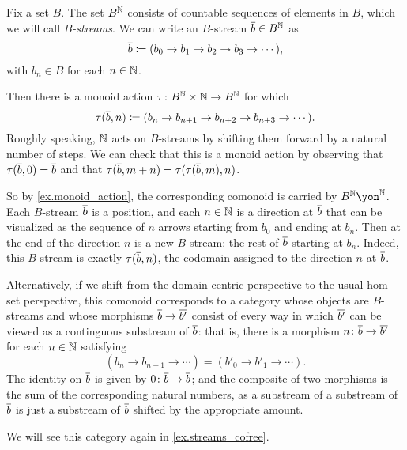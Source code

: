 \documentclass[Book-Poly]{subfiles}
\begin{document}
\begin{example}\label{ex.streams_category}
Fix a set $B$.
The set $B^{\mathbb{N}}$ consists of countable sequences of elements in $B$, which we will call \emph{$B$-streams}.
We can write an $B$-stream $\overline{b}\in B^{\mathbb{N}}$ as
\[
    \overline{b}\coloneqq(b_0\to b_1\to b_2\to b_3\to\cdots),
\]
with $b_n\in B$ for each $n\in\mathbb{N}$.

Then there is a monoid action $\tau\colon B^{\mathbb{N}}\times\mathbb{N}\to B^{\mathbb{N}}$ for which
\[
    \tau(\overline{b},n)\coloneqq(b_n\to b_{n+1}\to b_{n+2}\to b_{n+3}\to\cdots).
\]
Roughly speaking, $\mathbb{N}$ acts on $B$-streams by shifting them forward by a natural number of steps.
We can check that this is a monoid action by observing that $\tau(\overline{b},0)=\overline{b}$ and that $\tau(\overline{b},m+n)=\tau(\tau(\overline{b},m),n)$.

So by \cref{ex.monoid_action}, the corresponding comonoid is carried by $B^\nn\yon^\nn$.
Each $B$-stream $\overline{b}$ is a position, and each $n\in\mathbb{N}$ is a direction at $\overline{b}$ that can be visualized as the sequence of $n$ arrows starting from $b_0$ and ending at $b_n$.
Then at the end of the direction $n$ is a new $B$-stream: the rest of $\overline{b}$ starting at $b_n$.
Indeed, this $B$-stream is exactly $\tau(\overline{b},n)$, the codomain assigned to the direction $n$ at $\overline{b}$.

Alternatively, if we shift from the domain-centric perspective to the usual hom-set perspective, this comonoid corresponds to a category whose objects are $B$-streams and whose morphisms $\overline{b}\to\overline{b'}$ consist of every way in which $\overline{b'}$ can be viewed as a continguous substream of $\overline{b}$: that is, there is a morphism $n\colon\overline{b}\to\overline{b'}$ for each $n\in\mathbb{N}$ satisfying
\[
    (b_n\to b_{n+1}\to\cdots)=(b'_0\to b'_1\to\cdots).
\]
The identity on $\overline{b}$ is given by $0\colon\overline{b}\to\overline{b}$; and the composite of two morphisms is the sum of the corresponding natural numbers, as a substream of a substream of $\overline{b}$ is just a substream of $\overline{b}$ shifted by the appropriate amount.

We will see this category again in \cref{ex.streams_cofree}.
\end{example}
\end{document}

